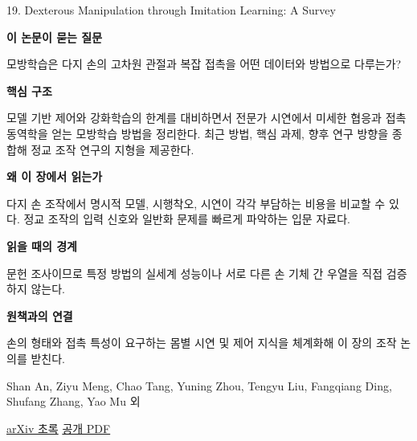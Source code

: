 \documentclass[11pt,openany]{book}
\begin{document}
\begin{termcard}{19. Dexterous Manipulation through Imitation Learning: A Survey}

\par

\medskip

{\sffamily\bfseries\color{deepblue} 이 논문이 묻는 질문}\par

모방학습은 다지 손의 고차원 관절과 복잡 접촉을 어떤 데이터와 방법으로 다루는가?

\smallskip

{\sffamily\bfseries\color{deepblue} 핵심 구조}\par

모델 기반 제어와 강화학습의 한계를 대비하면서 전문가 시연에서 미세한 협응과 접촉 동역학을 얻는 모방학습 방법을 정리한다. 최근 방법, 핵심 과제, 향후 연구 방향을 종합해 정교 조작 연구의 지형을 제공한다.

\smallskip

{\sffamily\bfseries\color{deepblue} 왜 이 장에서 읽는가}\par

다지 손 조작에서 명시적 모델, 시행착오, 시연이 각각 부담하는 비용을 비교할 수 있다. 정교 조작의 입력 신호와 일반화 문제를 빠르게 파악하는 입문 자료다.

\smallskip

{\sffamily\bfseries\color{coral} 읽을 때의 경계}\par

문헌 조사이므로 특정 방법의 실세계 성능이나 서로 다른 손 기체 간 우열을 직접 검증하지 않는다.

\smallskip

{\sffamily\bfseries\color{teal} 원책과의 연결}\par

손의 형태와 접촉 특성이 요구하는 몸별 시연 및 제어 지식을 체계화해 이 장의 조작 논의를 받친다.

\medskip

{\footnotesize\color{muted} Shan An, Ziyu Meng, Chao Tang, Yuning Zhou, Tengyu Liu, Fangqiang Ding, Shufang Zhang, Yao Mu 외\par

\href{https://arxiv.org/abs/2504.03515}{arXiv 초록} \quad \href{https://arxiv.org/pdf/2504.03515}{공개 PDF}\par}

\end{termcard}
\end{document}
